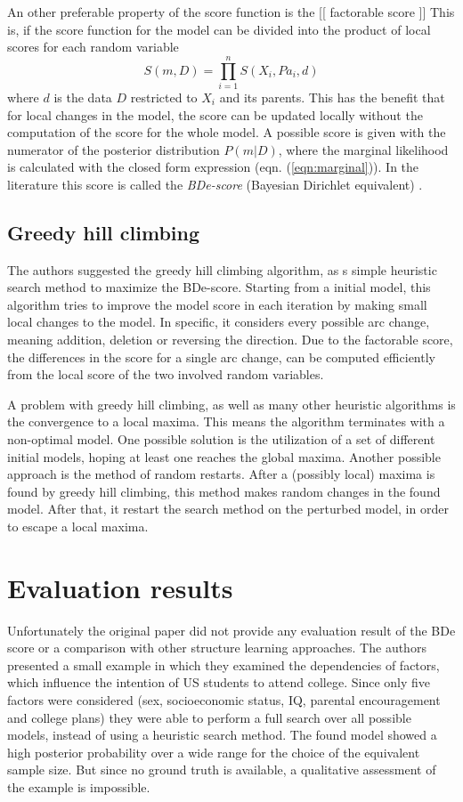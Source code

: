 \documentclass{article}
\begin{document}
	An other preferable property of the score function is the [[ factorable score ]]
	This is, if the score function for the model can be divided into the product of local scores for each
	random variable
	\[
		S(m,D) = \prod_{i=1}^n S(X_i, Pa_i, d)
	\]
	where $d$ is the data $D$ restricted to $X_i$ and its parents. This has the benefit that for local changes
	in the model, the score can be updated locally without the computation of the score for the whole model.
	A possible score is given with the numerator of the posterior distribution $P(m|D)$, where the
	marginal likelihood is calculated with the closed form expression (eqn. (\ref{eqn:marginal})).
	In the literature this score is called the \textit{BDe-score} (Bayesian Dirichlet equivalent)
	\cite{original}.
	
	\subsection{Greedy hill climbing}
	The authors suggested the greedy hill climbing algorithm, as s simple heuristic
	search method to maximize the BDe-score. Starting from a initial model, this algorithm
	tries to improve the model score in each iteration by making small local changes to
	the model. In specific, it considers every possible arc change, meaning addition, deletion
	or reversing the direction. Due to the factorable score, the differences in the score for a single
	arc change, can be computed efficiently from the local score of the two involved random variables.
	
	A problem with greedy hill climbing, as well as many other heuristic algorithms is the convergence
	to a local maxima. This means the algorithm terminates with a non-optimal model. One possible
	solution is the utilization of a set of different initial models, hoping at least one reaches
	the global maxima. Another possible approach is the method of random restarts. After a (possibly local)
  maxima is found by greedy hill climbing, this method makes random changes in the found model.
  After that, it restart the search method on the perturbed model, in order to escape a local maxima.
	
\section{Evaluation results}
Unfortunately the original paper did not provide any evaluation result of the BDe score or a
comparison with other structure learning approaches. The authors presented a small example
in which they examined the dependencies of factors, which influence the intention of
US students to attend college. Since only five factors were considered (sex, socioeconomic status,
IQ, parental encouragement and college plans) they were able to perform a full search over
all possible models, instead of using a heuristic search method. The found model showed a
high posterior probability over a wide range for the choice of the equivalent sample size.
But since no ground truth is available, a qualitative assessment of the example is impossible.
\end{document}
